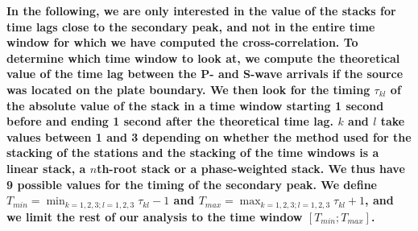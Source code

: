 \documentclass[draft]{agujournal2019}
\begin{document}
\textbf{In the following, we are only interested in the value of the stacks for time lags close to the secondary peak, and not in the entire time window for which we have computed the cross-correlation. To determine which time window to look at, we compute the theoretical value of the time lag between the P- and S-wave arrivals if the source was located on the plate boundary. We then look for the timing $\tau_{k l}$ of the absolute value of the stack in a time window starting 1 second before and ending 1 second after the theoretical time lag. $k$ and $l$ take values between 1 and 3 depending on whether the method used for the stacking of the stations and the stacking of the time windows is a linear stack, a $n$th-root stack or a phase-weighted stack. We thus have 9 possible values for the timing of the secondary peak. We define $T_{min} = \min_{k = 1,2,3 ; l=1,2,3} \tau_{k l} - 1$ and $T_{max} = \max_{k = 1,2,3 ; l=1,2,3} \tau_{k l} + 1$, and we limit the rest of our analysis to the time window $\left[ T_{min} ; T_{max} \right]$.} \\
\end{document}
